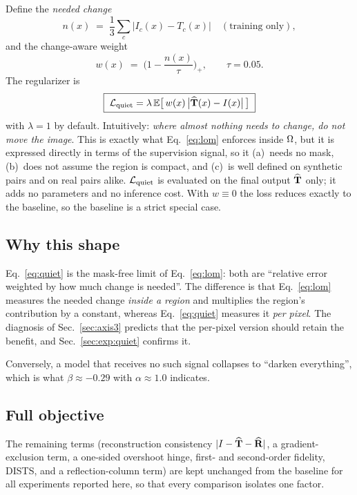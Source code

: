 Define the \emph{needed change}
\begin{equation}
n(x) \;=\; \frac{1}{3}\sum_{c}\big|I_c(x)-T_c(x)\big| \quad (\text{training only}),
\end{equation}
and the change-aware weight
\begin{equation}
w(x) \;=\; \Big(1-\frac{n(x)}{\tau}\Big)_{+},\qquad \tau=0.05 .
\end{equation}
The regularizer is
\begin{equation}
\boxed{\;\mathcal{L}_{\mathrm{quiet}}=\lambda\,\mathbb{E}\big[\,w(x)\,\big|\widehat{\mathbf{T}}(x)-I(x)\big|\,\big]\;}
\label{eq:quiet}
\end{equation}
with $\lambda=1$ by default. Intuitively: \emph{where almost nothing needs to change, do not move
the image}. This is exactly what Eq.~\eqref{eq:lom} enforces inside $\Omega$, but it is expressed
directly in terms of the supervision signal, so it (a)~needs no mask, (b)~does not assume the
region is compact, and (c)~is well defined on synthetic pairs and on real pairs alike.
$\mathcal{L}_{\mathrm{quiet}}$ is evaluated on the final output $\widehat{\mathbf{T}}$ only; it adds no parameters and no inference
cost. With $w\equiv0$ the loss reduces exactly to the baseline, so the baseline is a strict special
case.

\subsection{Why this shape}

Eq.~\eqref{eq:quiet} is the mask-free limit of Eq.~\eqref{eq:lom}: both are ``relative error
weighted by how much change is needed''. The difference is that Eq.~\eqref{eq:lom} measures the
needed change \emph{inside a region} and multiplies the region's contribution by a constant,
whereas Eq.~\eqref{eq:quiet} measures it \emph{per pixel}. The diagnosis of
Sec.~\ref{sec:axis3} predicts that the per-pixel version should retain the benefit, and
Sec.~\ref{sec:exp:quiet} confirms it.

Conversely, a model that receives no such signal collapses to
``darken everything'', which is what $\beta\approx-0.29$ with $\alpha\approx1.0$ indicates.

\subsection{Full objective}

The remaining terms (reconstruction consistency $|I-\widehat{\mathbf{T}}-\widehat{\mathbf{R}}|$, a gradient-exclusion term, a
one-sided overshoot hinge, first- and second-order fidelity, DISTS, and a reflection-column term)
are kept unchanged from the baseline for all experiments reported here, so that every comparison
isolates one factor.
